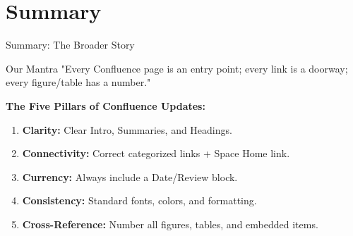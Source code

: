 \documentclass[10pt, aspectratio=169]{beamer}
\begin{document}
	\section{Summary}
	\begin{frame}{Summary: The Broader Story}
		\begin{block}{Our Mantra}
			"Every Confluence page is an entry point; every link is a doorway; every figure/table has a number."
		\end{block}
		\pause
		\textbf{The Five Pillars of Confluence Updates:}
		\begin{enumerate}
			\item \textbf{Clarity:} Clear Intro, Summaries, and Headings.
			\item \textbf{Connectivity:} Correct categorized links + Space Home link.
			\item \textbf{Currency:} Always include a Date/Review block.
			\item \textbf{Consistency:} Standard fonts, colors, and formatting.
			\item \textbf{Cross-Reference:} Number all figures, tables, and embedded items.
		\end{enumerate}
		\vfill
		\centering
		\href{https://confluence.yourcompany.com/display/SPACE}{}
	\end{frame}
	
\end{document}
